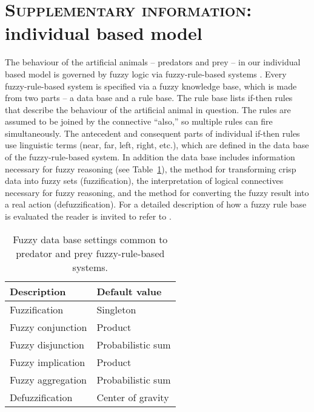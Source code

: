 








\section{\textsc{Supplementary information:} \textnormal{individual based model}}

The behaviour of the artificial animals -- predators and prey -- in our individual based model is governed by fuzzy logic \cite{zadeh1965fuzzy} via fuzzy-rule-based systems \cite{mamdani1974application}. Every fuzzy-rule-based system is specified via a fuzzy knowledge base, which is made from two parts -- a data base and a rule base. The rule base lists if-then rules that describe the behaviour of the artificial animal in question. The rules are assumed to be joined by the connective ``also,'' so multiple rules can fire simultaneously. The antecedent and consequent parts of individual if-then rules use linguistic terms (near, far, left, right, etc.), which are defined in the data base of the fuzzy-rule-based system. In addition the data base includes information necessary for fuzzy reasoning (see Table~\ref{table:fuzzy}), \ie the method for transforming crisp data into fuzzy sets (fuzzification), the interpretation of logical connectives necessary for fuzzy reasoning, and the method for converting the fuzzy result into a real action (defuzzification). For a detailed description of how a fuzzy rule base is evaluated the reader is invited to refer to \cite{lebarbajec2005fuzzy,lebarbajec2005simulating,mendel2001uncertain}.

\begin{table}
  \caption{Fuzzy data base settings common to predator and prey fuzzy-rule-based systems.}
  \label{table:fuzzy}
  \begin{tabular}{l l}
    \toprule
    Description & Default value \\ [0.5ex]
    \midrule 
    Fuzzification & Singleton \\
	Fuzzy conjunction & Product \\
    Fuzzy disjunction & Probabilistic sum \\
    Fuzzy implication & Product \\
    Fuzzy aggregation & Probabilistic sum \\
    Defuzzification & Center of gravity \\
    \bottomrule
  \end{tabular}
\end{table}

